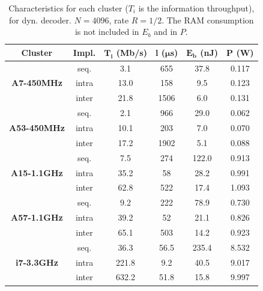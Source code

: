 \begin{table}
  \caption{Characteristics for each cluster ($T_i$ is the information
    throughput), for dyn. decoder. $N = 4096$, rate $R = 1/2$. The RAM
    consumption is not included in $E_b$ and in $P$.}
  \label{tab:polar_energy_results}
  \begin{center}
  \begin{tabular}{c | c | c | c | c | c}
    \textbf{Cluster} &
    \textbf{Impl.} &
    $\boldsymbol{T_i}$ \textbf{(Mb/s)} &
    $\boldsymbol{l}$   \textbf{($\boldsymbol{\mu}$s)} &
    $\boldsymbol{E_b}$ \textbf{(nJ)} &
    $\boldsymbol{P}$   \textbf{(W)}\\
    \hline
    \multirow{3}{*}{\textbf{A7-450MHz}}  & seq.  &  3.1 &  655 &  37.8 & 0.117 \\
                                         & intra & 13.0 &  158 &   9.5 & 0.123 \\
                                         & inter & 21.8 & 1506 &   6.0 & 0.131 \\
    \hline
    \multirow{3}{*}{\textbf{A53-450MHz}} & seq.  &  2.1 &  966 &  29.0 & 0.062 \\
                                         & intra & 10.1 &  203 &   7.0 & 0.070 \\
                                         & inter & 17.2 & 1902 &   5.1 & 0.088 \\
    \hline
    \multirow{3}{*}{\textbf{A15-1.1GHz}} & seq.  &  7.5 &  274 & 122.0 & 0.913 \\
                                         & intra & 35.2 &   58 &  28.2 & 0.991 \\
                                         & inter & 62.8 &  522 &  17.4 & 1.093 \\
    \hline
    \multirow{3}{*}{\textbf{A57-1.1GHz}} & seq.  &  9.2 &  222 &  78.9 & 0.730 \\
                                         & intra & 39.2 &   52 &  21.1 & 0.826 \\
                                         & inter & 65.1 &  503 &  14.2 & 0.923 \\
    \hline
    \multirow{3}{*}{\textbf{i7-3.3GHz}} & seq.  &  36.3 & 56.5 & 235.4 &  8.532 \\
                                        & intra & 221.8 &  9.2 &  40.5 &  9.017 \\
                                        & inter & 632.2 & 51.8 &  15.8 &  9.997 \\
  \end{tabular}
  \end{center}
\end{table}

